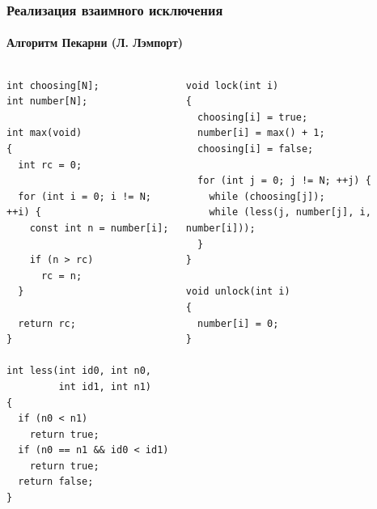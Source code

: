 \begin{frame}[fragile]
\frametitle{Реализация взаимного исключения}
\framesubtitle{Алгоритм Пекарни (Л. Лэмпорт)}

\begin{columns}[T]
  \begin{column}{.45\linewidth}
    \begin{lstlisting}
int choosing[N];
int number[N];

int max(void)
{
  int rc = 0;

  for (int i = 0; i != N; ++i) {
    const int n = number[i];

    if (n > rc)
      rc = n;
  }

  return rc;
}

int less(int id0, int n0,
         int id1, int n1)
{
  if (n0 < n1)
    return true;
  if (n0 == n1 && id0 < id1)
    return true;
  return false;
}
    \end{lstlisting}
  \end{column}
  \begin{column}{.45\linewidth}
    \begin{lstlisting}
void lock(int i)
{
  choosing[i] = true;
  number[i] = max() + 1;
  choosing[i] = false;

  for (int j = 0; j != N; ++j) {
    while (choosing[j]);
    while (less(j, number[j], i, number[i]));
  }
}

void unlock(int i)
{
  number[i] = 0;
}
    \end{lstlisting}
  \end{column}
\end{columns}
\end{frame}
